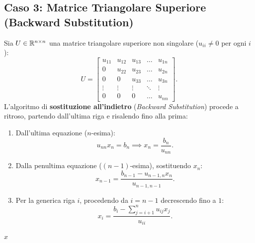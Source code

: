 \subsection{Caso 3: Matrice Triangolare Superiore (Backward Substitution)}
Sia $U \in \mathbb{R}^{n \times n}$ una matrice triangolare superiore non singolare ($u_{ii} \neq 0$ per ogni $i$):
\begin{equation}
    U = \begin{bmatrix}
        u_{11} & u_{12} & u_{13} & \dots & u_{1n} \\
        0 & u_{22} & u_{23} & \dots & u_{2n} \\
        0 & 0 & u_{33} & \dots & u_{3n} \\
        \vdots & \vdots & \vdots & \ddots & \vdots \\
        0 & 0 & 0 & \dots & u_{nn}
    \end{bmatrix}.
\end{equation}
L'algoritmo di \textbf{sostituzione all'indietro} (\textit{Backward Substitution}) procede a ritroso, partendo dall'ultima riga e risalendo fino alla prima:
\begin{enumerate}
    \item Dall'ultima equazione ($n$-esima):
    \begin{equation}
        u_{nn} x_n = b_n \implies x_n = \frac{b_n}{u_{nn}}.
    \end{equation}
    \item Dalla penultima equazione ($(n-1)$-esima), sostituendo $x_n$:
    \begin{equation}
        x_{n-1} = \frac{b_{n-1} - u_{n-1, n} x_n}{u_{n-1, n-1}}.
    \end{equation}
    \item Per la generica riga $i$, procedendo da $i = n-1$ decrescendo fino a $1$:
    \begin{equation}
        x_i = \frac{b_i - \sum_{j=i+1}^n u_{ij} x_j}{u_{ii}}.
        \label{eq:formula-backward-sub}
    \end{equation}
\end{enumerate}

\begin{algorithm}[H]
\caption{Backward Substitution (Sostituzione all'Indietro)}
\label{alg:backward-substitution}
\Return $x$\;
\end{algorithm}

